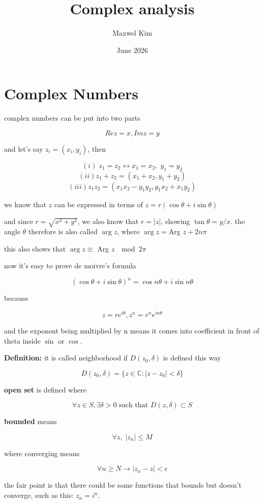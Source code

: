 \documentclass{article}
\title{Complex analysis}
\author{Maxwel Kim}
\date{June 2026}
\begin{document}
\maketitle

\section*{Complex Numbers}

complex numbers can be put into two parts

\[
Re z=x, Im z=y
\]

and let's say $z_i=(x_i,y_i)$, then 

\[
(i) \; z_1=z_2 \longleftrightarrow x_1=x_2,\; y_1=y_2
\]
\[
(ii)z_1+z_2=(x_1+x_2,y_1+y_2)
\]
\[
(iii)z_1z_2=(x_1x_2-y_1y_2,y_1x_2+x_1y_2)
\]

we know that $z$ can be expressed in terms of $z=r(\cos\theta+i\sin\theta)$

and since $r=\sqrt{x^2+y^2}$, we also know that $r=|z|$, showing $\tan\theta=y/x$. the angle $\theta$ therefore is also called $\arg z$, where $\arg z= $Arg $z + 2n\pi$

this also shows that $\arg z \equiv$ Arg $z \; \mod 2\pi$

now it's easy to prove de moivre's formula

\[
(\cos\theta+i\sin\theta)^n=\cos n\theta+i\sin n\theta
\]

because 

\[
z=re^{i\theta}, z^n=r^ne^{in\theta}
\]

and the exponent being multiplied by n means it comes into coefficient in front of theta inside $\sin $ or $\cos $.

\textbf{Definition:} it is called neighborhood if $D(z_0,\delta)$ is defined this way

\[
D(z_0,\delta)=\{z\in \mathbb{C} : |z-z_0|<\delta\}
\]

\textbf{open set} is defined where 

\[
\forall z\in S, \exists\delta>0 \; \text{such that } D(z,\delta)\subset S
\]

\textbf{bounded} means 

\[
\forall z, \; |z_n|\leq M
\]

where converging means 

\[
\forall n\geq N \rightarrow |z_n-z|<\epsilon
\]

the fair point is that there could be some functions that bounds but doesn't converge, such as this: $z_n=i^n$.
\end{document}
